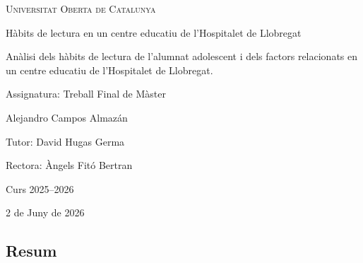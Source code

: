 \documentclass[12pt]{article}
\newcommand{\subsectiononumber}[1]{%
  \subsection*{#1}
  \phantomsection
}
\begin{document}
\begin{titlepage}
    \centering
    
    {\scshape\Large Universitat Oberta de Catalunya \par}
    \vspace{2cm}
    
    {\Huge
    Hàbits de lectura en un centre educatiu de l'Hospitalet de Llobregat\par
    }

    \vspace{1cm}
    
    {\Large
    Anàlisi dels hàbits de lectura de l'alumnat adolescent i dels factors relacionats en un centre educatiu de l'Hospitalet de Llobregat.
    \par}

    \vspace{3cm}
    
    {\Large
    Assignatura: Treball Final de Màster\par}
    
    \vspace{4cm}
    
    {\Large
    Alejandro Campos Almazán\par}
    
    \vspace{0.5cm}
    
    {\large Tutor: David Hugas Germa}

    \vspace{0.5cm}

    {\large Rectora: Àngels Fitó Bertran}
    
    \vspace{2cm}
    
    {\large
    Curs 2025--2026}
    
    \vspace{0.5cm}

    {\large
    2 de Juny de 2026}
\end{titlepage}

\thispagestyle{empty}   %
\setcounter{page}{0}  %
\newpage

\subsectiononumber{Resum}
\end{document}
